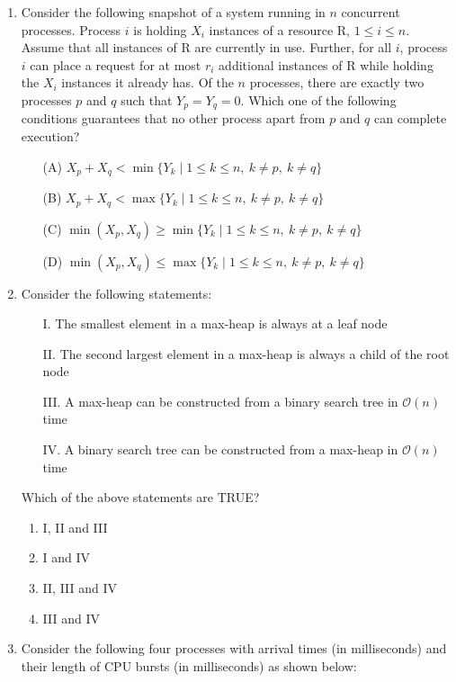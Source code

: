 \documentclass[12pt]{article}
\begin{document}
\begin{enumerate}[label=Q.\arabic*]
\item Consider the following snapshot of a system running in $n$ concurrent processes. Process $i$ is holding $X_i$ instances of a resource R, $1 \leq i \leq n$. Assume that all instances of R are currently in use. Further, for all $i$, process $i$ can place a request for at most $r_i$ additional instances of R while holding the $X_i$ instances it already has. Of the $n$ processes, there are exactly two processes $p$ and $q$ such that $Y_p = Y_q = 0$. Which one of the following conditions guarantees that no other process apart from $p$ and $q$ can complete execution?
\begin{enumerate}
  \item[(A)] $X_p + X_q < \min \{ Y_k \mid 1 \leq k \leq n,\ k \neq p,\ k \neq q \}$
  \item[(B)] $X_p + X_q < \max \{ Y_k \mid 1 \leq k \leq n,\ k \neq p,\ k \neq q \}$
  \item[(C)] $\min(X_p, X_q) \geq \min \{ Y_k \mid 1 \leq k \leq n,\ k \neq p,\ k \neq q \}$
  \item[(D)] $\min(X_p, X_q) \leq \max \{ Y_k \mid 1 \leq k \leq n,\ k \neq p,\ k \neq q \}$
\end{enumerate}
\item Consider the following statements:

\begin{enumerate}
\item[I.] The smallest element in a max-heap is always at a leaf node
\item[II.] The second largest element in a max-heap is always a child of the root node
\item[III.] A max-heap can be constructed from a binary search tree in $\mathcal{O}(n)$ time
\item[IV.] A binary search tree can be constructed from a max-heap in $\mathcal{O}(n)$ time
\end{enumerate}

Which of the above statements are TRUE?

\begin{enumerate}[label=(\Alph*)]
\item I, II and III
\item I and IV
\item II, III and IV
\item III and IV
\end{enumerate}

\item Consider the following four processes with arrival times (in milliseconds) and their length of CPU bursts (in milliseconds) as shown below:


\end{enumerate}
\end{document}
